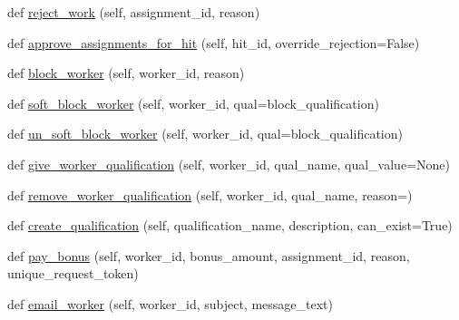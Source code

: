 \begin{DoxyCompactItemize}
\item 
def \hyperlink{classparlai_1_1mturk_1_1core_1_1dev_1_1mturk__manager_1_1MTurkManager_ac7196b1435c273c7ad50f5fef98d6d00}{reject\+\_\+work} (self, assignment\+\_\+id, reason)
\item 
def \hyperlink{classparlai_1_1mturk_1_1core_1_1dev_1_1mturk__manager_1_1MTurkManager_ab77c6bdccf256625b918d0215b7bfcdf}{approve\+\_\+assignments\+\_\+for\+\_\+hit} (self, hit\+\_\+id, override\+\_\+rejection=False)
\item 
def \hyperlink{classparlai_1_1mturk_1_1core_1_1dev_1_1mturk__manager_1_1MTurkManager_a615892361c61bb0010f5c4902fc81ff8}{block\+\_\+worker} (self, worker\+\_\+id, reason)
\item 
def \hyperlink{classparlai_1_1mturk_1_1core_1_1dev_1_1mturk__manager_1_1MTurkManager_a49b4bffc7ffa32c280822cf9e21b5e24}{soft\+\_\+block\+\_\+worker} (self, worker\+\_\+id, qual=\textquotesingle{}block\+\_\+qualification\textquotesingle{})
\item 
def \hyperlink{classparlai_1_1mturk_1_1core_1_1dev_1_1mturk__manager_1_1MTurkManager_a539bd100a420b5750644480f9ad3fb12}{un\+\_\+soft\+\_\+block\+\_\+worker} (self, worker\+\_\+id, qual=\textquotesingle{}block\+\_\+qualification\textquotesingle{})
\item 
def \hyperlink{classparlai_1_1mturk_1_1core_1_1dev_1_1mturk__manager_1_1MTurkManager_a20e66905d846c6551ab65c328e084d11}{give\+\_\+worker\+\_\+qualification} (self, worker\+\_\+id, qual\+\_\+name, qual\+\_\+value=None)
\item 
def \hyperlink{classparlai_1_1mturk_1_1core_1_1dev_1_1mturk__manager_1_1MTurkManager_af36071c43873823fdeebba1f6aa13bd1}{remove\+\_\+worker\+\_\+qualification} (self, worker\+\_\+id, qual\+\_\+name, reason=\textquotesingle{}\textquotesingle{})
\item 
def \hyperlink{classparlai_1_1mturk_1_1core_1_1dev_1_1mturk__manager_1_1MTurkManager_a2eb341bf9b3791d0c502592445816775}{create\+\_\+qualification} (self, qualification\+\_\+name, description, can\+\_\+exist=True)
\item 
def \hyperlink{classparlai_1_1mturk_1_1core_1_1dev_1_1mturk__manager_1_1MTurkManager_aac90e7ff80cd6dc170c0b8fa0c21483d}{pay\+\_\+bonus} (self, worker\+\_\+id, bonus\+\_\+amount, assignment\+\_\+id, reason, unique\+\_\+request\+\_\+token)
\item 
def \hyperlink{classparlai_1_1mturk_1_1core_1_1dev_1_1mturk__manager_1_1MTurkManager_ac64c09da4a9c4e2f2cc74889f2f829d5}{email\+\_\+worker} (self, worker\+\_\+id, subject, message\+\_\+text)
\end{DoxyCompactItemize}
